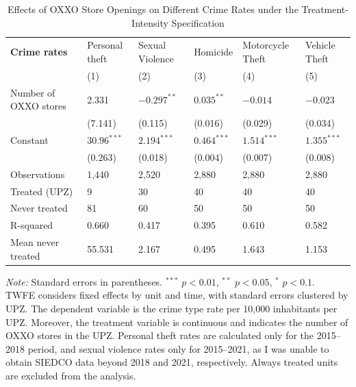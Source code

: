 \documentclass[12pt]{article}
\begin{document}
\begin{table}[htbp]
\centering
\caption{Effects of OXXO Store Openings on Different Crime Rates under the Treatment-Intensity Specification}
\label{tab:resultados_regresion_intensity}
\small


\begin{tabularx}{\textwidth}{l C C C C C}
\hline\hline
\textbf{Crime rates} & Personal theft & Sexual Violence & Homicide & Motorcycle Theft & Vehicle Theft \\
 & (1) & (2) & (3) & (4) & (5) \\
\hline
Number of OXXO stores    & 2.331         & $-0.297^{**}$ & $0.035^{**}$ & $-0.014$     & $-0.023$\\
                         & (7.141)       & (0.115)       & (0.016)      & (0.029)      & (0.034) \\
Constant                 & $30.96^{***}$ & $2.194^{***}$ & $0.464^{***}$ & $1.514^{***}$ & $1.355^{***}$ \\
                         & (0.263)       & (0.018)       & (0.004)       & (0.007)       & (0.008) \\
\hline
Observations       & 1,440  & 2,520 & 2,880 & 2,880 & 2,880 \\
Treated (UPZ)      & 9      & 30    & 40    & 40    & 40    \\
Never treated      & 81     & 60    & 50    & 50    & 50    \\
R-squared          & 0.660  & 0.417 & 0.395 & 0.610 & 0.582 \\
Mean never treated & 55.531 & 2.167 & 0.495 & 1.643 & 1.153 \\
\hline\hline
\end{tabularx}

\vspace{0.5em}
\parbox{\textwidth}{\footnotesize
    \textit{Note:} Standard errors in parentheses. $^{***}$ $p<0.01$, $^{**}$ $p<0.05$, $^{*}$ $p<0.1$. \\
    TWFE considers fixed effects by unit and time, with standard errors clustered by UPZ. 
    The dependent variable is the crime type rate per 10,000 inhabitants per UPZ. 
    Moreover, the treatment variable is continuous and indicates the number of OXXO stores in the UPZ.
    Personal theft rates are calculated only for the 2015–2018 period, and sexual violence rates only for 2015–2021, as I was unable to obtain SIEDCO data beyond 2018 and 2021, respectively.
    Always treated units are excluded from the analysis.
}
\end{table}
\end{document}
